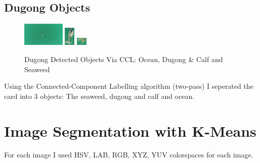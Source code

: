 \documentclass[conference]{IEEEtran}
\begin{document}
\subsection{Dugong Objects} 
\begin{figure}[H]
    \centerline{
        {\includegraphics[width=20mm, scale=0.5]{./figures/task 3/dugong/DetectedObject-1.png}}
        {\includegraphics[width=5mm, scale=0.5]{./figures/task 3/dugong/DetectedObject-2.png}}
        {\includegraphics[width=5mm, scale=0.5]{./figures/task 3/dugong/DetectedObject-3.png}}
    }
    \caption{Dugong Detected Objects Via CCL: Ocean, Dugong \& Calf and Seaweed}
    \label{fig}
\end{figure}
Using the Connected-Component Labelling algorithm (two-pass) I seperated the card into 3 objects: The seaweed, dugong and calf and ocean.
\pagebreak
\section{Image Segmentation with K-Means}
For each image I used HSV, LAB, RGB, XYZ, YUV colorspaces for each image.
\end{document}
